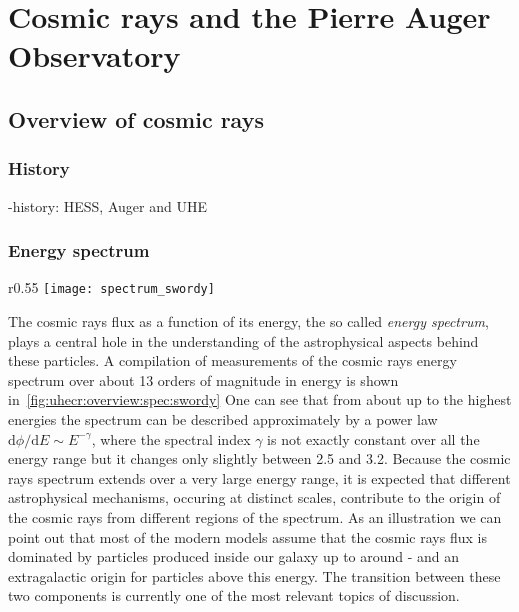 \chapter{Cosmic rays and the Pierre Auger Observatory}
\label{sec:uhecr}


\cite{Mollerach:2017idb}

\section{Overview of cosmic rays}
\label{sec:uhecr:overview}

\subsection{History}

-history: HESS, Auger and UHE

\subsection{Energy spectrum}

\begin{wrapfigure}{r}{0.55\textwidth}
  \centering
  \texttt{[image: spectrum\_swordy]}
  \caption{\cite{SwordyPlot2001}}
  \label{fig:uhecr:overview:spec:swordy}
\end{wrapfigure}

The cosmic rays flux as a function of its energy, the so called \emph{energy spectrum},
plays a central hole in the understanding of the astrophysical aspects behind these particles.
A compilation of measurements of the cosmic rays
energy spectrum over about 13 orders of magnitude
in energy is shown in~\cref{fig:uhecr:overview:spec:swordy}
One can see that from about  up to the highest energies
the spectrum can be described approximately 
by a power law $\text{d}\phi/\text{d}E \sim E^{-\gamma}$, where
the spectral index $\gamma$ is not exactly constant over all the energy range
but it changes only slightly between 2.5 and 3.2.
Because the cosmic rays spectrum extends over a very large
energy range, it is expected that different astrophysical mechanisms,
occuring at distinct scales, contribute to the origin
of the cosmic rays from different regions of the spectrum. As an illustration
we can point out that most of the modern models assume that the cosmic rays flux
is dominated by particles produced inside our galaxy up to around - and
an extragalactic origin for particles above this energy. The transition between
these two components is currently one of the most relevant topics of discussion.


